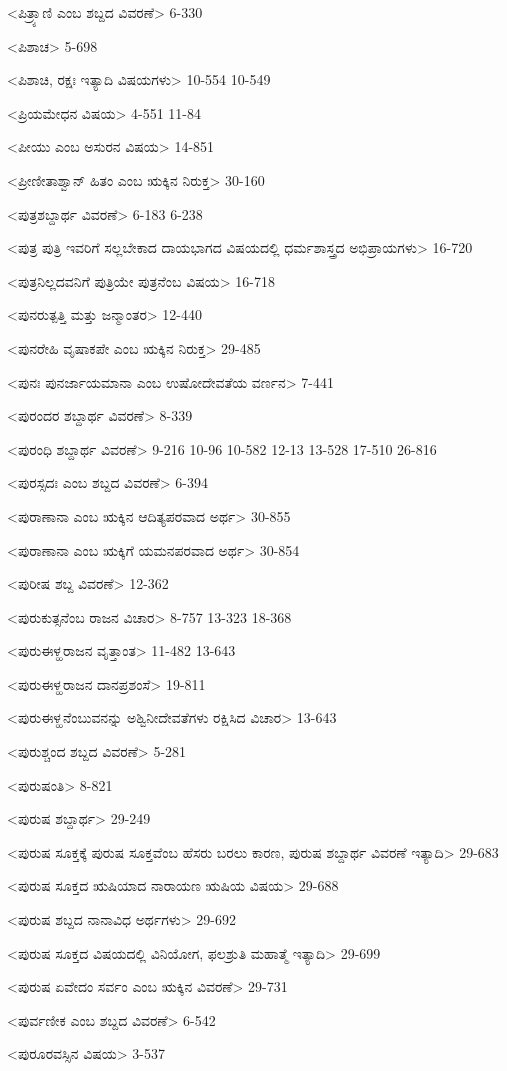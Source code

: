<ಪಿತ್ರ್ಯಾಣಿ ಎಂಬ ಶಬ್ದದ ವಿವರಣೆ>
6-330

<ಪಿಶಾಚ>
5-698

<ಪಿಶಾಚಿ, ರಕ್ಷಃ ಇತ್ಯಾದಿ ವಿಷಯಗಳು>
10-554
10-549

<ಪ್ರಿಯಮೇಧನ ವಿಷಯ>
4-551
11-84

<ಪೀಯು ಎಂಬ ಅಸುರನ ವಿಷಯ>
14-851

<ಪ್ರೀಣೀತಾಶ್ವಾನ್‍ ಹಿತಂ ಎಂಬ ಋಕ್ಕಿನ ನಿರುಕ್ತ>
30-160

<ಪುತ್ರಶಬ್ದಾರ್ಥ ವಿವರಣೆ>
6-183
6-238


<ಪುತ್ರ ಪುತ್ರಿ ಇವರಿಗೆ ಸಲ್ಲಬೇಕಾದ ದಾಯಭಾಗದ ವಿಷಯದಲ್ಲಿ ಧರ್ಮಶಾಸ್ತ್ರದ ಅಭಿಪ್ರಾಯಗಳು>
16-720

<ಪುತ್ರನಿಲ್ಲದವನಿಗೆ ಪುತ್ರಿಯೇ ಪುತ್ರನೆಂಬ ವಿಷಯ>
16-718

<ಪುನರುತ್ಪತ್ತಿ ಮತ್ತು ಜನ್ಮಾಂತರ>
12-440

<ಪುನರೇಹಿ ವೃಷಾಕಪೇ ಎಂಬ ಋಕ್ಕಿನ ನಿರುಕ್ತ>
29-485

<ಪುನಃ ಪುನರ್ಜಾಯಮಾನಾ ಎಂಬ ಉಷೋದೇವತೆಯ ವರ್ಣನ>
7-441

<ಪುರಂದರ ಶಬ್ದಾರ್ಥ ವಿವರಣೆ>
8-339

<ಪುರಂಧಿ ಶಬ್ದಾರ್ಥ ವಿವರಣೆ>
9-216 
10-96 
10-582 
12-13 
13-528 
17-510
26-816

<ಪುರಸ್ಸದಃ ಎಂಬ ಶಬ್ದದ ವಿವರಣೆ>
6-394

<ಪುರಾಣಾನಾ ಎಂಬ ಋಕ್ಕಿನ ಆದಿತ್ಯಪರವಾದ ಅರ್ಥ>
30-855

<ಪುರಾಣಾನಾ ಎಂಬ ಋಕ್ಕಿಗೆ ಯಮನಪರವಾದ ಅರ್ಥ>
30-854

<ಪುರೀಷ ಶಬ್ದ ವಿವರಣೆ>
12-362

<ಪುರುಕುತ್ಸನೆಂಬ ರಾಜನ ವಿಚಾರ>
8-757 
13-323
18-368

<ಪುರುಈಳ್ಹರಾಜನ ವೃತ್ತಾಂತ>
11-482
13-643

<ಪುರುಈಳ್ಹರಾಜನ ದಾನಪ್ರಶಂಸೆ>
19-811

<ಪುರುಈಳ್ಹನೆಂಬುವನನ್ನು ಅಶ್ವಿನೀದೇವತೆಗಳು ರಕ್ಷಿಸಿದ ವಿಚಾರ>
13-643

<ಪುರುಶ್ಚಂದ ಶಬ್ದದ ವಿವರಣೆ>
5-281

<ಪುರುಷಂತಿ>
8-821

<ಪುರುಷ ಶಬ್ದಾರ್ಥ>
29-249

<ಪುರುಷ ಸೂಕ್ತಕ್ಕೆ ಪುರುಷ ಸೂಕ್ತವೆಂಬ ಹೆಸರು ಬರಲು ಕಾರಣ, ಪುರುಷ ಶಬ್ದಾರ್ಥ ವಿವರಣೆ ಇತ್ಯಾದಿ>
29-683

<ಪುರುಷ ಸೂಕ್ತದ ಋಷಿಯಾದ ನಾರಾಯಣ ಋಷಿಯ ವಿಷಯ>
29-688

<ಪುರುಷ ಶಬ್ದದ ನಾನಾವಿಧ ಅರ್ಥಗಳು>
29-692

<ಪುರುಷ ಸೂಕ್ತದ ವಿಷಯದಲ್ಲಿ ವಿನಿಯೋಗ, ಫಲಶ್ರುತಿ ಮಹಾತ್ಮೆ ಇತ್ಯಾದಿ>
29-699

<ಪುರುಷ ಏವೇದಂ ಸರ್ವಂ ಎಂಬ ಋಕ್ಕಿನ ವಿವರಣೆ>
29-731

<ಪುರ್ವಣೀಕ ಎಂಬ ಶಬ್ದದ ವಿವರಣೆ>
6-542

<ಪುರೂರವಸ್ಸಿನ ವಿಷಯ>
3-537

